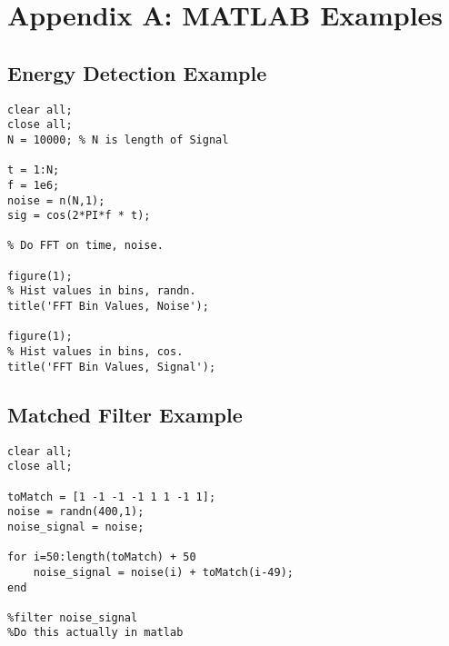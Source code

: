 \appendix
\chapter{Appendix A: MATLAB Examples}
\section{Energy Detection Example}
\begin{verbatim}
clear all;
close all;
N = 10000; % N is length of Signal 

t = 1:N;
f = 1e6;
noise = n(N,1);
sig = cos(2*PI*f * t);

% Do FFT on time, noise.

figure(1);
% Hist values in bins, randn.
title('FFT Bin Values, Noise');

figure(1);
% Hist values in bins, cos.
title('FFT Bin Values, Signal');
\end{verbatim}
\section{Matched Filter Example}

\begin{verbatim}
clear all;
close all;

toMatch = [1 -1 -1 -1 1 1 -1 1];
noise = randn(400,1);
noise_signal = noise;

for i=50:length(toMatch) + 50
    noise_signal = noise(i) + toMatch(i-49);
end

%filter noise_signal
%Do this actually in matlab
\end{verbatim}
